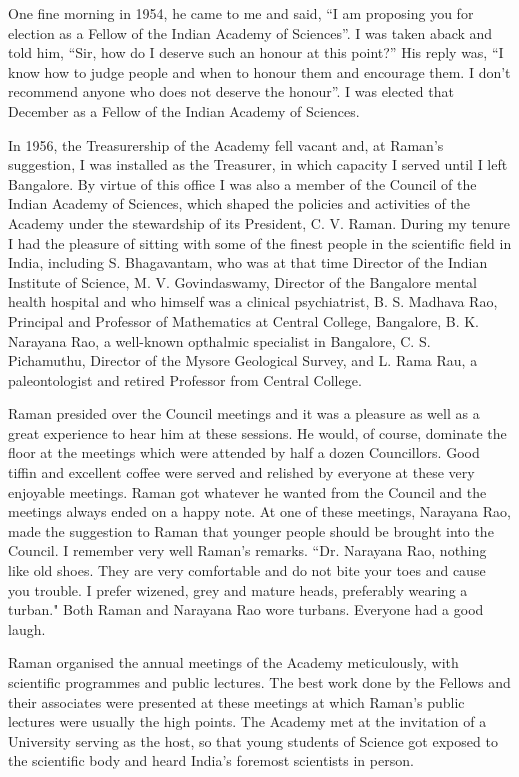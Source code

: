 One fine morning in 1954, he came to me and said, ``I am proposing you for election as a Fellow of the Indian Academy of Sciences''. I was taken aback and told him, ``Sir, how do I deserve such an honour at this point?'' His reply was, ``I know how to judge people and when to honour them and encourage them. I don't recommend anyone who does not deserve the honour''. I was elected that December as a Fellow of the Indian Academy of Sciences.

In 1956, the Treasurership of the Academy fell vacant and, at Raman's suggestion, I was installed as the Treasurer, in which capacity I served until I left Bangalore. By virtue of this office I was also a member of the Council of the Indian Academy of Sciences, which shaped the policies and activities of the Academy under the stewardship of its President, C. V. Raman. During my tenure I had the pleasure of sitting with some of the finest people in the scientific field in India, including S. Bhagavantam, who was at that time Director of the Indian Institute of Science, M. V. Govindaswamy, Director of the Bangalore mental health hospital and who himself was a clinical psychiatrist, B. S. Madhava Rao, Principal and Professor of Mathematics at Central College, Bangalore, B. K. Narayana Rao, a well-known opthalmic specialist in Bangalore, C. S. Pichamuthu, Director of the Mysore Geological Survey, and L. Rama Rau, a paleontologist and retired Professor from Central College.

Raman presided over the Council meetings and it was a pleasure as well as a great experience to hear him at these sessions. He would, of course, dominate the floor at the meetings which were attended by half a dozen Councillors. Good  tiffin and excellent coffee were served and relished by everyone at these very enjoyable meetings. Raman got whatever he wanted from the Council and the meetings always ended on a happy note. At one of these meetings, Narayana Rao, made the suggestion to Raman that younger people should be brought into the Council. I remember very well Raman's remarks. ``Dr. Narayana Rao, nothing like old shoes. They are very comfortable and do not bite your toes and cause you trouble. I prefer wizened, grey and mature heads, preferably wearing a turban." Both Raman and Narayana Rao wore turbans. Everyone had a good laugh.

Raman organised the annual meetings of the Academy meticulously, with scientific programmes and public lectures. The best work done by the Fellows and their associates were presented at these meetings at which Raman's public lectures were usually the high points. The Academy met at the invitation of a University serving as the host, so that young students of Science got exposed to the scientific body and heard India's foremost scientists in person.


